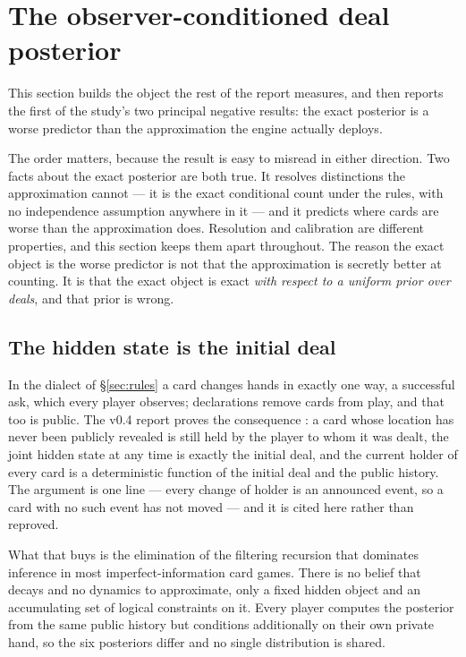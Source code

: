 \section{The observer-conditioned deal posterior}
\label{sec:belief}

This section builds the object the rest of the report measures, and then reports
the first of the study's two principal negative results: the exact posterior is a
worse predictor than the approximation the engine actually deploys.

The order matters, because the result is easy to misread in either direction.
Two facts about the exact posterior are both true. It resolves distinctions the
approximation cannot --- it is the exact conditional count under the rules, with
no independence assumption anywhere in it --- and it predicts where cards are
worse than the approximation does. Resolution and calibration are different
properties, and this section keeps them apart throughout. The reason the exact
object is the worse predictor is not that the approximation is secretly better at
counting. It is that the exact object is exact \emph{with respect to a uniform
prior over deals}, and that prior is wrong.

\subsection{The hidden state is the initial deal}
\label{sec:belief-state}

In the dialect of \S\ref{sec:rules} a card changes hands in exactly one way, a
successful ask, which every player observes; declarations remove cards from play,
and that too is public. The v0.4 report proves the consequence
\cite{fishbot04}: a card whose location has never been publicly revealed is still
held by the player to whom it was dealt, the joint hidden state at any time is
exactly the initial deal, and the current holder of every card is a
deterministic function of the initial deal and the public history. The argument
is one line --- every change of holder is an announced event, so a card with no
such event has not moved --- and it is cited here rather than reproved.

What that buys is the elimination of the filtering recursion that dominates
inference in most imperfect-information card games. There is no belief that
decays and no dynamics to approximate, only a fixed hidden object and an
accumulating set of logical constraints on it. Every player computes the
posterior from the same public history but conditions additionally on their own
private hand, so the six posteriors differ and no single distribution is shared.

